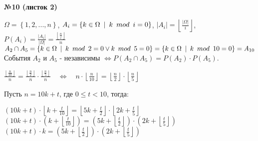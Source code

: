 \documentclass{article}
\newenvironment{task}{\begin{center}\fontsize{14}{14}\selectfont\bf}{\rm\fontsize{12}{12}\selectfont\end{center}}
\begin{document}
	\begin{task} 
		№10 (листок 2)
	\end{task}
 	$\Omega = \left\lbrace 1, 2, ..., n \right\rbrace $, \hfill $A_i = \left\lbrace k \in \Omega \hspace{5px} | \hspace{5px} k \hspace{5px} mod \hspace{5px} i = 0 \right\rbrace $, \hfill $|A_i| = \left\lfloor \frac{|\Omega|}{i} \right\rfloor$, \hfill $P(A_i) = \frac{|A_i|}{|\Omega|} = \frac{\left\lfloor \frac{n}{i} \right\rfloor}{n}$ \\
 	$A_2 \cap A_5 = \left\lbrace k \in \Omega \hspace{5px} | \hspace{5px} k \hspace{5px} mod \hspace{5px} 2 = 0 \vee k \hspace{5px} mod \hspace{5px} 5 = 0\right\rbrace = \left\lbrace k \in \Omega \hspace{5px} | \hspace{5px} k \hspace{5px} mod \hspace{5px} 10 = 0 \right\rbrace = A_{10}$ \\
 	События $A_2$ и $A_5$ - независимы $\Leftrightarrow P(A_2 \cap A_5) = P(A_2)\cdot P(A_5)$.\\
 	\begin{center}
 	$\frac{\left\lfloor \frac{n}{10} \right\rfloor}{n} = \frac{\left\lfloor \frac{n}{2} \right\rfloor}{n} \cdot \frac{\left\lfloor \frac{n}{5} \right\rfloor}{n} \quad \Leftrightarrow \quad n\cdot \left\lfloor \frac{n}{10} \right\rfloor = \left\lfloor \frac{n}{2} \right\rfloor \cdot \left\lfloor \frac{n}{5} \right\rfloor $ \\
 	\end{center}
 	Пусть $n = 10k + t$, где $0 \leq t < 10$, тогда: \\ 
 	\begin{center}
 	$\left(10k+t\right)\cdot \left\lfloor k + \frac{t}{10} \right\rfloor = \left\lfloor 5k + \frac{t}{2} \right\rfloor \cdot \left\lfloor 2k + \frac{t}{5} \right\rfloor$ \\
 	$\left(10k+t\right)\cdot\left(k + \left\lfloor \frac{t}{10} \right\rfloor \right) = \left( 5k + \left\lfloor \frac{t}{2} \right\rfloor \right) \cdot \left( 2k + \left\lfloor\frac{t}{5} \right\rfloor \right) $ \\
 	$\left(10k+t\right)\cdot k = \left( 5k + \left\lfloor \frac{t}{2} \right\rfloor \right) \cdot \left( 2k + \left\lfloor\frac{t}{5} \right\rfloor \right) $ \\
	\end{center}
\end{document}
